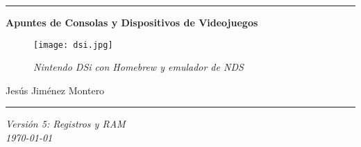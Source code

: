 \documentclass[12pt]{article}
\date{}
\begin{document}
\nocite{atkinson}
\nocite{circuitverse}
\nocite{chatgpt}
\nocite{duke}
\nocite{texstudio}
\begin{titlepage}
        \begin{center}


        \hrule
        \vspace{1cm}
        \vspace{1cm}
        {\bfseries\huge Apuntes de Consolas y Dispositivos de Videojuegos \par}
        \vspace{2cm}

        \begin{figure}[H]
            \centering
            \texttt{[image: dsi.jpg]}
            \caption*{\footnotesize{\textit{Nintendo DSi con Homebrew y emulador de NDS}}}
            \label{fig:dsi}
        \end{figure}

        {\large
        Jesús Jiménez Montero \\
        \par}
        \vspace{1cm}
        \hrule
        \vspace{1cm}

        {\large
        \textit{Versión 5: Registros y RAM\\
        \today}
        \par}
        \end{center}
\end{titlepage}

\newpage
\renewcommand{\contentsname}{Tabla de contenidos}
\setcounter{secnumdepth}{5}
\tableofcontents
\setcounter{tocdepth}{4}

\newpage
\newpage
\renewcommand{\listfigurename}{Lista de figuras}
\thispagestyle{empty}
\listoffigures
\newpage

\renewcommand{\listtablename}{Lista de tablas}
\listoftables
\newpage
\end{document}
